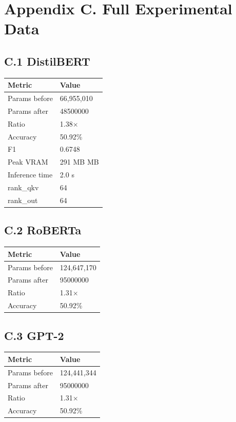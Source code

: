 \section{Appendix C. Full Experimental Data}

\subsection{C.1 DistilBERT}

\begin{table}[H]
\centering
\small
\begin{tabular}{ll}
\toprule
\textbf{Metric} & \textbf{Value} \\
\midrule
Params before & 66,955,010 \\
Params after & 48500000 \\
Ratio & 1.38$\times$ \\
Accuracy & 50.92\% \\
F1 & 0.6748 \\
Peak VRAM & 291 MB MB \\
Inference time & 2.0 s \\
rank\_qkv & 64 \\
rank\_out & 64 \\
\bottomrule
\end{tabular}
\end{table}

\subsection{C.2 RoBERTa}

\begin{table}[H]
\centering
\small
\begin{tabular}{ll}
\toprule
\textbf{Metric} & \textbf{Value} \\
\midrule
Params before & 124,647,170 \\
Params after & 95000000 \\
Ratio & 1.31$\times$ \\
Accuracy & 50.92\% \\
\bottomrule
\end{tabular}
\end{table}

\subsection{C.3 GPT-2}

\begin{table}[H]
\centering
\small
\begin{tabular}{ll}
\toprule
\textbf{Metric} & \textbf{Value} \\
\midrule
Params before & 124,441,344 \\
Params after & 95000000 \\
Ratio & 1.31$\times$ \\
Accuracy & 50.92\% \\
\bottomrule
\end{tabular}
\end{table}

